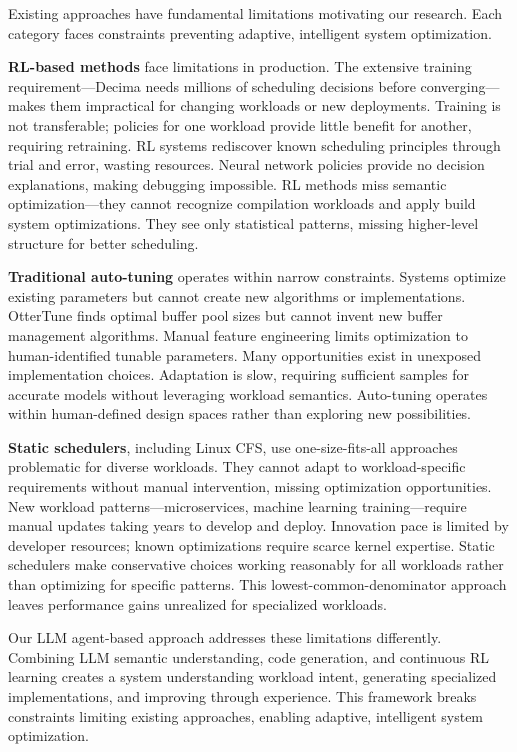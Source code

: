 Existing approaches have fundamental limitations motivating our research. Each category faces constraints preventing adaptive, intelligent system optimization.

\textbf{RL-based methods} face limitations in production. The extensive training requirement—Decima needs millions of scheduling decisions before converging—makes them impractical for changing workloads or new deployments. Training is not transferable; policies for one workload provide little benefit for another, requiring retraining. RL systems rediscover known scheduling principles through trial and error, wasting resources. Neural network policies provide no decision explanations, making debugging impossible. RL methods miss semantic optimization—they cannot recognize compilation workloads and apply build system optimizations. They see only statistical patterns, missing higher-level structure for better scheduling.

\textbf{Traditional auto-tuning} operates within narrow constraints. Systems optimize existing parameters but cannot create new algorithms or implementations. OtterTune finds optimal buffer pool sizes but cannot invent new buffer management algorithms. Manual feature engineering limits optimization to human-identified tunable parameters. Many opportunities exist in unexposed implementation choices. Adaptation is slow, requiring sufficient samples for accurate models without leveraging workload semantics. Auto-tuning operates within human-defined design spaces rather than exploring new possibilities.

\textbf{Static schedulers}, including Linux CFS, use one-size-fits-all approaches problematic for diverse workloads. They cannot adapt to workload-specific requirements without manual intervention, missing optimization opportunities. New workload patterns—microservices, machine learning training—require manual updates taking years to develop and deploy. Innovation pace is limited by developer resources; known optimizations require scarce kernel expertise. Static schedulers make conservative choices working reasonably for all workloads rather than optimizing for specific patterns. This lowest-common-denominator approach leaves performance gains unrealized for specialized workloads.

Our LLM agent-based approach addresses these limitations differently. Combining LLM semantic understanding, code generation, and continuous RL learning creates a system understanding workload intent, generating specialized implementations, and improving through experience. This framework breaks constraints limiting existing approaches, enabling adaptive, intelligent system optimization.